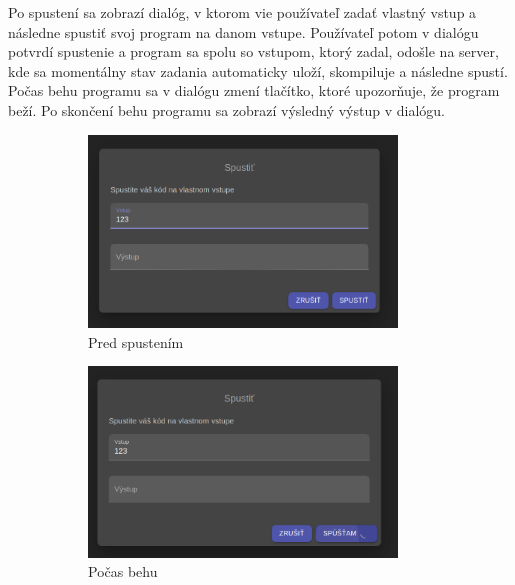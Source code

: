 Po spustení sa zobrazí dialóg, v ktorom vie používateľ zadať vlastný vstup a následne spustiť svoj
program na danom vstupe. Používateľ potom v dialógu potvrdí spustenie a program sa spolu so vstupom,
ktorý zadal, odošle na server, kde sa momentálny stav zadania automaticky uloží, skompiluje a
následne spustí. Počas behu programu sa v dialógu zmení tlačítko, ktoré upozorňuje, že program beží.
Po skončení behu programu sa zobrazí výsledný výstup v dialógu.
\begin{figure}[H]
\centering
\begin{subfigure}{.3\textwidth}
  \centering
  \includegraphics[width=0.9\textwidth]{images/spusti_dialog}
  \caption[Pred spustením]{Pred spustením}
  \label{obr:spusti_dialog}
\end{subfigure}%
\begin{subfigure}{.3\textwidth}
  \centering
  \includegraphics[width=0.9\textwidth]{images/spusti_dialog_beh}
  \caption[Počas behu]{Počas behu}
  \label{obr:spusti_dialog_beh}
\end{subfigure}
\begin{subfigure}{.3\textwidth}
  \centering

\end{subfigure}
\end{figure}
